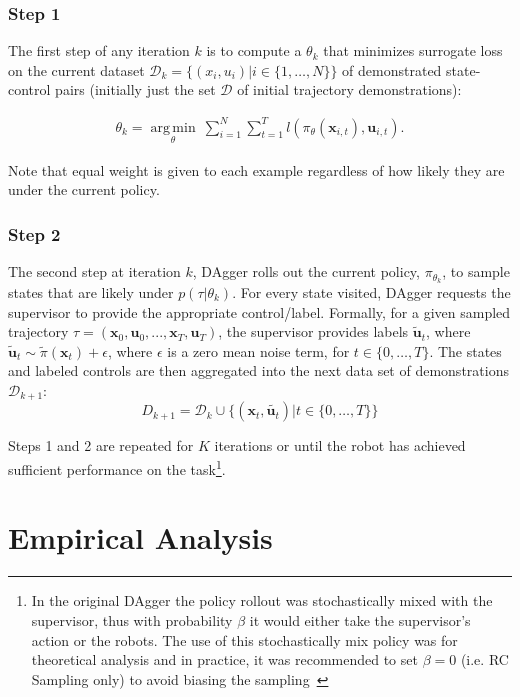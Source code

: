 \documentclass[10pt, conference]{ieeeconf}      %
\DeclareMathOperator*{\argmin}{arg\,min}
\newcommand{\bu}{\mathbf{u}}
\newcommand{\bx}{\mathbf{x}}
\begin{document}
\subsubsection{Step 1}
The first step of any iteration $k$ is to compute a $\theta_k$ that minimizes surrogate loss on the current dataset $\mathcal{D}_k=\{(x_i,u_i)|i\in\{1,\ldots,N\}\}$ of demonstrated state-control pairs (initially just the set $\mathcal{D}$ of initial trajectory demonstrations):

 \vspace{-1ex}
\begin{align}\label{eq:super_objj}
\theta_{k} = \underset{\theta}{\argmin} \: \sum_{i=1}^{N} \sum_{t=1}^T  l(\pi_{\theta}(\bx_{i,t}),\bu_{i,t}).
\end{align}

\noindent Note that equal weight is given to each example regardless of how likely they are under the current policy.
 

 \subsubsection{Step 2}
The second step at iteration $k$, DAgger rolls out the current policy, $\pi_{\theta_{k}}$, to sample states that are likely under $p(\tau|\theta_{k})$.  For every state visited, DAgger requests the supervisor to provide the appropriate control/label. Formally, for a given sampled trajectory  $\tau = (\bx_0,\bu_0,...,\bx_T,\bu_T )$, the supervisor provides labels $\tilde{\bu}_t$, where $\tilde{\bu}_t \sim \tilde{\pi}(\bx_t) + \epsilon$, where $\epsilon$ is a  zero mean noise term, for $t\in \{0, \ldots, T\}$.
The states and labeled controls are then aggregated into the next data set of demonstrations $\mathcal{D}_{k+1}$:
$$D_{k+1}=\mathcal{D}_k \cup \{(\bx_t,\tilde{\bu_t})|t\in\{0,\ldots,T\}\} $$

\noindent Steps 1 and 2 are repeated for $K$ iterations or until the robot has achieved sufficient performance on the
task\footnote{In the original DAgger the policy rollout was stochastically mixed with the supervisor, thus with
    probability $\beta$ it would either take the supervisor's action or the robots. The use of this stochastically mix
    policy was for theoretical analysis and in practice, it was recommended to set $\beta = 0$ (i.e. RC Sampling only) to avoid biasing the
sampling~\cite{NIPS2014_5421,ross2010reduction}}.


 


\section{Empirical Analysis}
\end{document}
